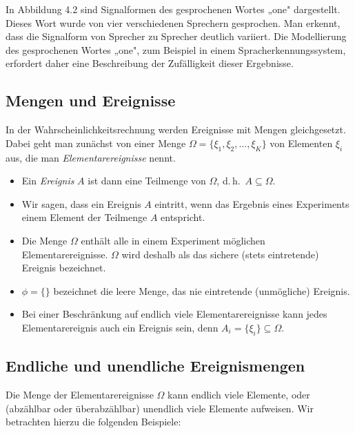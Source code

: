 \begin{beispiel}
In Abbildung 4.2 sind Signalformen des gesprochenen Wortes „one" dargestellt. Dieses Wort wurde von vier verschiedenen Sprechern gesprochen. Man erkennt, dass die Signalform von Sprecher zu Sprecher deutlich variiert. Die Modellierung des gesprochenen Wortes „one", zum Beispiel in einem Spracherkennungssystem, erfordert daher eine Beschreibung der Zufälligkeit dieser Ergebnisse.

\end{beispiel}

\subsection{Mengen und Ereignisse}
\label{sec:mengen-ereignisse}

In der Wahrscheinlichkeitsrechnung werden Ereignisse mit Mengen gleichgesetzt. Dabei geht man zunächst von einer Menge $\Omega = \{\xi_1, \xi_2, \ldots, \xi_K\}$ von Elementen $\xi_i$ aus, die man \textit{Elementarereignisse} nennt.

\begin{itemize}
  \item Ein \textit{Ereignis} $A$ ist dann eine Teilmenge von $\Omega$, d.\,h.\ $A \subseteq \Omega$.
  \item Wir sagen, dass ein Ereignis $A$ eintritt, wenn das Ergebnis eines Experiments einem Element der Teilmenge $A$ entspricht.
  \item Die Menge $\Omega$ enthält alle in einem Experiment möglichen Elementarereignisse. $\Omega$ wird deshalb als das sichere (stets eintretende) Ereignis bezeichnet.
  \item $\phi = \{\}$ bezeichnet die leere Menge, das nie eintretende (unmögliche) Ereignis.
  \item Bei einer Beschränkung auf endlich viele Elementarereignisse kann jedes Elementarereignis auch ein Ereignis sein, denn $A_i = \{\xi_i\} \subseteq \Omega$.
\end{itemize}

\subsection{Endliche und unendliche Ereignismengen}
\label{sec:ereignismengen}

Die Menge der Elementarereignisse $\Omega$ kann endlich viele Elemente, oder (abzählbar oder überabzählbar) unendlich viele Elemente aufweisen. Wir betrachten hierzu die folgenden Beispiele:

